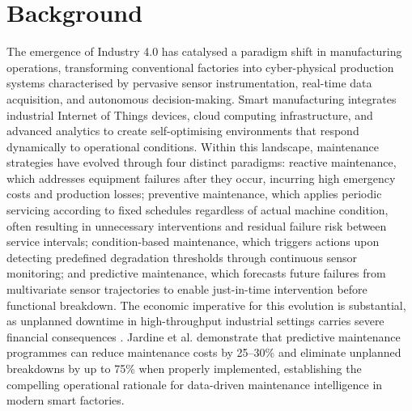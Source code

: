\section{Background}

The emergence of Industry 4.0 has catalysed a paradigm shift in manufacturing operations, transforming conventional factories into cyber-physical production systems characterised by pervasive sensor instrumentation, real-time data acquisition, and autonomous decision-making. Smart manufacturing integrates industrial Internet of Things devices, cloud computing infrastructure, and advanced analytics to create self-optimising environments that respond dynamically to operational conditions. Within this landscape, maintenance strategies have evolved through four distinct paradigms: reactive maintenance, which addresses equipment failures after they occur, incurring high emergency costs and production losses; preventive maintenance, which applies periodic servicing according to fixed schedules regardless of actual machine condition, often resulting in unnecessary interventions and residual failure risk between service intervals; condition-based maintenance, which triggers actions upon detecting predefined degradation thresholds through continuous sensor monitoring; and predictive maintenance, which forecasts future failures from multivariate sensor trajectories to enable just-in-time intervention before functional breakdown. The economic imperative for this evolution is substantial, as unplanned downtime in high-throughput industrial settings carries severe financial consequences \cite{mobley_introduction_2002}. Jardine et al. \cite{jardine_review_2006} demonstrate that predictive maintenance programmes can reduce maintenance costs by 25--30\% and eliminate unplanned breakdowns by up to 75\% when properly implemented, establishing the compelling operational rationale for data-driven maintenance intelligence in modern smart factories.

